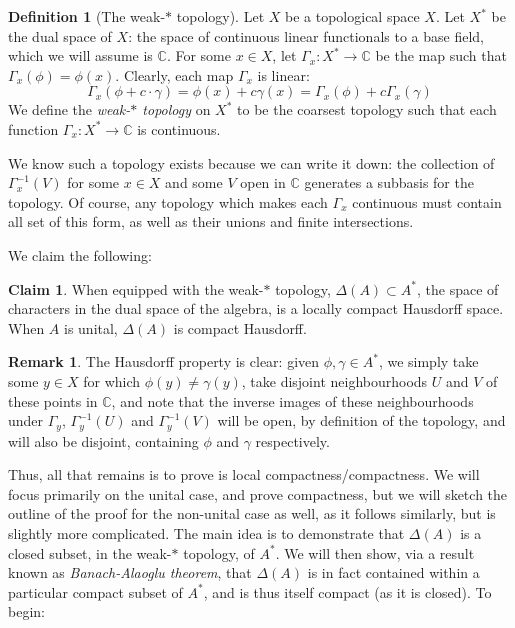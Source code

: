 \documentclass[aps,pra,showpacs,notitlepage,onecolumn,superscriptaddress,nofootinbib]{revtex4-1}
\theoremstyle{definition}
\newtheorem{definition}{Definition}[section]
\newtheorem{remark}{Remark}[section]
\newtheorem{claim}{Claim}[section]
\begin{document}
\begin{definition}[The weak-$*$ topology]
  \label{def:weak}
  Let $X$ be a topological space $X$. Let $X^{*}$ be the dual space of $X$: the space of continuous linear functionals to a base field, which we will
  assume is $\mathbb{C}$. For some $x \in X$, let $\Gamma_x : X^{*} \rightarrow \mathbb{C}$ be the map such that $\Gamma_x(\phi) = \phi(x)$. Clearly,
  each map $\Gamma_x$ is linear:
  \begin{equation}
    \Gamma_x(\phi + c \cdot \gamma) = \phi(x) + c \gamma(x) = \Gamma_x(\phi) + c \Gamma_x(\gamma)
  \end{equation}
  We define the \emph{weak-$*$ topology} on $X^{*}$ to be the coarsest topology such that each function $\Gamma_x : X^{*} \rightarrow \mathbb{C}$ is continuous.

  We know such a topology exists because we can write it down: the collection of $\Gamma_x^{-1}(V)$ for some $x \in X$ and
  some $V$ open in $\mathbb{C}$ generates a subbasis for the topology. Of course, any topology which makes each $\Gamma_x$ continuous must contain all
  set of this form, as well as their unions and finite intersections.
\end{definition}

\noindent We claim the following:

\begin{claim}
  When equipped with the weak-$*$ topology, $\Delta(A) \subset A^{*}$, the space of characters in the dual space of the algebra, is a locally compact Hausdorff space.
  When $A$ is unital, $\Delta(A)$ is compact Hausdorff.
  \end{claim}

\begin{remark}
The Hausdorff property is clear: given $\phi, \gamma \in A^{*}$, we simply take some $y \in X$ for which $\phi(y) \neq \gamma(y)$,
take disjoint neighbourhoods $U$ and $V$ of these points in $\mathbb{C}$, and note that the inverse images of these neighbourhoods under $\Gamma_y$, $\Gamma_y^{-1}(U)$ and $\Gamma_y^{-1}(V)$ will be open,
by definition of the topology, and will also be disjoint, containing $\phi$ and $\gamma$
respectively.
\end{remark}

Thus, all that remains is to prove is local compactness/compactness. We will focus primarily on the unital case, and prove compactness, but
we will sketch the outline of the proof for the non-unital case as well, as it follows similarly, but is slightly more complicated. The main
idea is to demonstrate that $\Delta(A)$ is a closed subset, in the weak-$*$ topology, of $A^{*}$. We will then show, via a result known as \emph{Banach-Alaoglu theorem},
that $\Delta(A)$ is in fact contained within a particular compact subset of $A^{*}$, and is thus itself compact (as it is closed). To begin:
\end{document}
